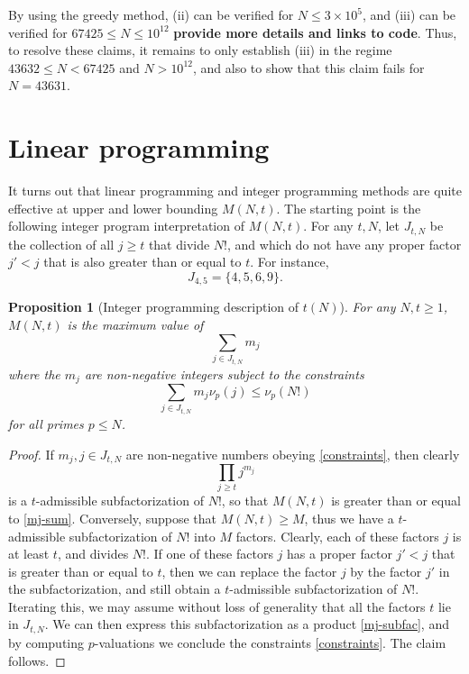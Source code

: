 \documentclass[12pt,a4paper,reqno]{amsart}
\numberwithin{equation}{section}
\theoremstyle{plain}
\newtheorem{proposition}[theorem]{Proposition}
\theoremstyle{definition}
\begin{document}
By using the greedy method, (ii) can be verified for $N \leq 3 \times 10^5$, and (iii) can be verified for $67425 \leq N \leq 10^{12}$ {\bf provide more details and links to code}.    Thus, to resolve these claims, it remains to only establish (iii) in the regime $43632 \leq N < 67425$ and $N > 10^{12}$, and also to show that this claim fails for $N=43631$.


\section{Linear programming}\label{linprog-sec}

It turns out that linear programming and integer programming methods are quite effective at upper and lower bounding $M(N,t)$.  The starting point is the following integer program interpretation of $M(N,t)$. For any $t,N$, let $J_{t,N}$ be the collection of all $j \geq t$ that divide $N!$, and which do not have any proper factor $j' < j$ that is also greater than or equal to $t$.  For instance,
$$ J_{4,5} = \{ 4, 5, 6, 9 \}.$$ 

\begin{proposition}[Integer programming description of $t(N)$]\label{fip}  For any $N,t \geq 1$, $M(N,t)$ is the maximum value of
\begin{equation}\label{mj-sum}
   \sum_{j \in J_{t,N}} m_j
\end{equation}
where the $m_j$ are non-negative integers subject to the constraints
\begin{equation}\label{constraints}
  \sum_{j \in J_{t,N}} m_j \nu_p(j) \leq \nu_p(N!)
\end{equation}
for all primes $p \leq N$.
\end{proposition}

\begin{proof}  If $m_j, j \in J_{t,N}$ are non-negative numbers obeying \eqref{constraints}, then clearly
  \begin{equation}\label{mj-subfac} 
    \prod_{j \geq t} j^{m_j}
  \end{equation}
is a $t$-admissible subfactorization of $N!$, so that $M(N,t)$ is greater than or equal to \eqref{mj-sum}. Conversely, suppose that $M(N,t) \geq M$, thus we have a $t$-admissible subfactorization of $N!$ into $M$ factors.  Clearly, each of these factors $j$ is at least $t$, and divides $N!$.
If one of these factors $j$ has a proper factor $j' < j$ that is greater than or equal to $t$, then we can replace the factor $j$ by the factor $j'$ in the subfactorization, and still obtain a $t$-admissible subfactorization of $N!$.  Iterating this, we may assume without loss of generality that all the factors $t$ lie in $J_{t,N}$.  We can then express this subfactorization as a product \eqref{mj-subfac}, and by computing $p$-valuations we conclude the constraints \eqref{constraints}.  The claim follows.
\end{proof}
\end{document}
